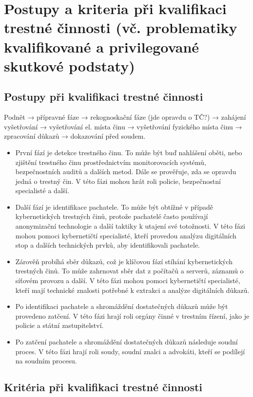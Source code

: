 \newpage
\section{Postupy a kriteria při kvalifikaci trestné činnosti (vč. problematiky kvalifikované a privilegované skutkové podstaty)}

\subsection{Postupy při kvalifikaci trestné činnosti}

Podnět → přípravné fáze → rekognoskační fáze (jde opravdu o TČ?) → zahájení vyšetřování → vyšetřování el. místa činu → vyšetřování fyzického místa činu → zpracování důkazů → dokazování před soudem.
\begin{itemize}
    \item První fází je detekce trestného činu. To může být buď nahlášení oběti, nebo zjištění trestného činu prostřednictvím monitorovacích systémů, bezpečnostních auditů a dalších metod. Dále se prověřuje, zda se opravdu jedná o trestný čin. V této fázi mohou hrát roli policie, bezpečnostní specialisté a další.
    \item Další fází je identifikace pachatele. To může být obtížné v případě kybernetických trestných činů, protože pachatelé často používají anonymizační technologie a další taktiky k utajení své totožnosti. V této fázi mohou pomoci kybernetičtí specialisté, kteří provedou analýzu digitálních stop a dalších technických prvků, aby identifikovali pachatele.
    \item Zárověň probíhá sběr důkazů, což je klíčovou fází stíhání kybernetických trestných činů. To může zahrnovat sběr dat z počítačů a serverů, záznamů o síťovém provozu a další. V této fázi mohou pomoci kybernetičtí specialisté, kteří mají technické znalosti potřebné k extrakci a analýze digitálních důkazů.
    \item  Po identifikaci pachatele a shromáždění dostatečných důkazů může být provedeno zatčení. V této fázi hrají roli orgány činné v trestním řízení, jako je policie a státní zastupitelství.
    \item Po zatčení pachatele a shromáždění dostatečných důkazů následuje soudní proces. V této fázi hrají roli soudy, soudní znalci a advokáti, kteří se podílejí na soudním procesu.
\end{itemize}

\subsection{Kritéria při kvalifikaci trestné činnosti}


